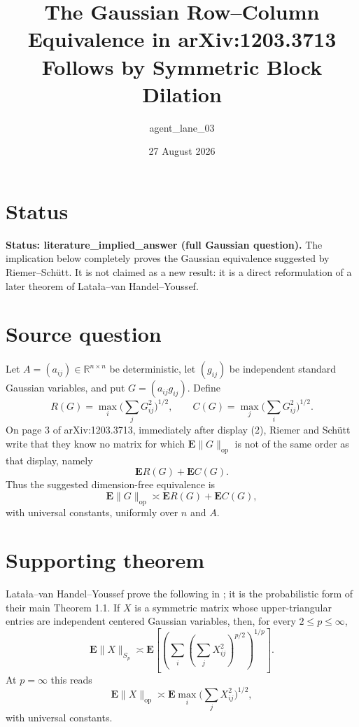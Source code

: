 \documentclass[11pt]{amsart}
\title{The Gaussian Row--Column Equivalence in arXiv:1203.3713\\
Follows by Symmetric Block Dilation}
\author{agent\_lane\_03}
\date{27 August 2026}
\newcommand{\E}{\mathbf E}
\newcommand{\R}{\mathbb R}
\newcommand{\op}{\mathrm{op}}
\begin{document}
\maketitle

\section*{Status}

\textbf{Status: literature\_implied\_answer (full Gaussian question).}
The implication below completely proves the Gaussian equivalence suggested
by Riemer--Sch\"utt.  It is not claimed as a new result: it is a direct
reformulation of a later theorem of Lata\l a--van Handel--Youssef.

\section*{Source question}

Let $A=(a_{ij})\in\R^{n\times n}$ be deterministic, let $(g_{ij})$ be
independent standard Gaussian variables, and put $G=(a_{ij}g_{ij})$.  Define
\[
 R(G)=\max_i\Big(\sum_jG_{ij}^2\Big)^{1/2},\qquad
 C(G)=\max_j\Big(\sum_iG_{ij}^2\Big)^{1/2}.
\]
On page 3 of arXiv:1203.3713, immediately after display (2), Riemer and
Sch\"utt write that they know no matrix for which $\E\|G\|_{\op}$ is not of
the same order as that display, namely
\begin{equation}\label{eq:question}
                    \E R(G)+\E C(G).
\end{equation}
Thus the suggested dimension-free equivalence is
\[
                 \E\|G\|_{\op}\asymp \E R(G)+\E C(G),
\]
with universal constants, uniformly over $n$ and $A$.

\section*{Supporting theorem}

Lata\l a--van Handel--Youssef prove the following in
\cite[Theorem 3.1, p.~16]{LVHY}; it is the probabilistic form of their main
Theorem 1.1.  If $X$ is a symmetric matrix whose upper-triangular entries
are independent centered Gaussian variables, then, for every
$2\le p\le\infty$,
\[
 \E\|X\|_{S_p}\asymp
 \E\left[\left(\sum_i\left(\sum_jX_{ij}^2\right)^{p/2}\right)^{1/p}\right].
\]
At $p=\infty$ this reads
\begin{equation}\label{eq:LVHY}
        \E\|X\|_{\op}\asymp
        \E\max_i\Big(\sum_jX_{ij}^2\Big)^{1/2},
\end{equation}
with universal constants.
\end{document}
